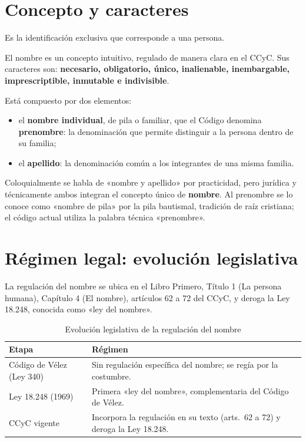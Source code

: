 \documentclass[12pt,oneside]{book}
\begin{document}
\section{Concepto y caracteres}

\begin{definicion}[Nombre]
Es la identificación exclusiva que corresponde a una persona.
\end{definicion}

El nombre es un concepto intuitivo, regulado de manera clara en el CCyC. Sus caracteres son: \textbf{necesario, obligatorio, único, inalienable, inembargable, imprescriptible, inmutable e indivisible}.

Está compuesto por dos elementos:

\begin{itemize}
\item el \textbf{nombre individual}, de pila o familiar, que el Código denomina \textbf{prenombre}: la denominación que permite distinguir a la persona dentro de su familia;
\item el \textbf{apellido}: la denominación común a los integrantes de una misma familia.
\end{itemize}

Coloquialmente se habla de «nombre y apellido» por practicidad, pero jurídica y técnicamente ambos integran el concepto único de \textbf{nombre}. Al prenombre se lo conoce como «nombre de pila» por la pila bautismal, tradición de raíz cristiana; el código actual utiliza la palabra técnica «prenombre».

\section{Régimen legal: evolución legislativa}

La regulación del nombre se ubica en el Libro Primero, Título 1 (La persona humana), Capítulo 4 (El nombre), artículos 62 a 72 del CCyC, y deroga la Ley 18.248, conocida como «ley del nombre».

\begin{table}[H]
\centering
\begin{tabularx}{\textwidth}{B{0.30\textwidth} Y}
\toprule
\textbf{Etapa} & \textbf{Régimen} \\
\midrule
Código de Vélez (Ley 340) & Sin regulación específica del nombre; se regía por la costumbre. \\
Ley 18.248 (1969) & Primera «ley del nombre», complementaria del Código de Vélez. \\
CCyC vigente & Incorpora la regulación en su texto (arts.~62 a 72) y deroga la Ley 18.248. \\
\bottomrule
\end{tabularx}
\caption{Evolución legislativa de la regulación del nombre}
\end{table}
\end{document}
